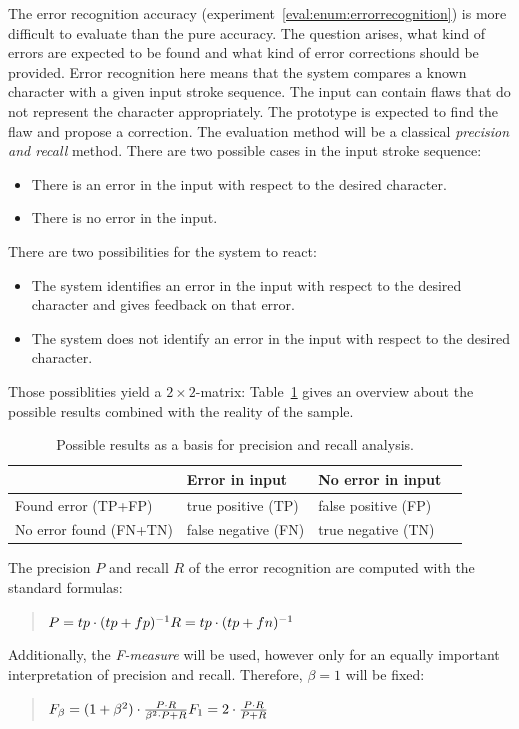 The error recognition accuracy (experiment~\ref{eval:enum:errorrecognition}) 
is more difficult to evaluate than the pure accuracy.
The question arises, what kind of errors are expected to be found
and what kind of error corrections should be provided.
Error recognition here means that the system compares a known character with 
a given input stroke sequence. The input can contain flaws that do not 
represent the character appropriately. The prototype is expected to find the flaw
and propose a correction.
The evaluation method will be a classical \emph{precision and recall} method.
There are two possible cases in the input stroke sequence:
\begin{itemize}
  \item There is an error in the input with respect to the desired character.
  \item There is no error in the input.
\end{itemize}
There are two possibilities for the system to react:
\begin{itemize}
  \item The system identifies an error in the input with respect to the desired
        character and gives feedback on that error.
  \item The system does not identify an error in the input with respect to the
        desired character.
\end{itemize}
Those possiblities yield a \(2 \times 2\)-matrix:
Table~\ref{table:eval:resultsforprecisionandrecall} gives an overview about 
the possible results combined with the reality of the sample.

\begin{table}[htbp]
\begin{center}
  \begin{tabular}{|l|l|l|p{200pt}|}
    \hline
                           & Error in input      & No error in input \\
    \hline
    Found error (TP+FP)    & true positive (TP)  & false positive (FP) \\
    \hline
    No error found (FN+TN) & false negative (FN) & true negative (TN) \\
    \hline
  \end{tabular}
\end{center}
\caption{Possible results as a basis for precision and recall analysis.}
\label{table:eval:resultsforprecisionandrecall}
\end{table}
The precision \(P\) and recall \(R\) of the error recognition are computed 
with the standard formulas:
\begin{quote}
\(
P=tp \cdot (tp+fp)^{-1} \\
R=tp \cdot (tp+fn)^{-1} \\
\)  
\end{quote}
Additionally, the \emph{F-measure} will be used, however only for an equally 
important interpretation of precision and recall. Therefore, \(\beta = 1\) will
be fixed:
\begin{quote}
\(
F_{\beta} = (1 + \beta^2) \cdot \frac{P \cdot R }{ \beta^2 \cdot P + R} \\
F_{1} = 2 \cdot \frac{P \cdot R }{P + R} \\
\)
\end{quote}

